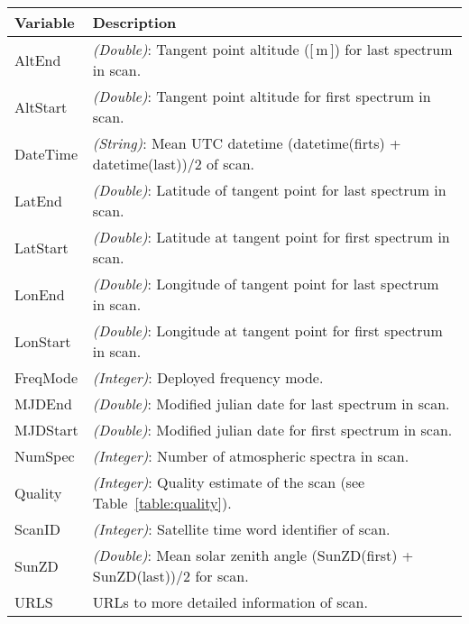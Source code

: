 \begin{table}
\caption{Content description of Level1 log data of a scan as returned from GET calls to
\url{/rest_api/<version>/level1/<freqmode>/<scanno>/Log/}.
Latitudes and longitudes are given as geodetic
coordinates using WGS84 reference ellipsoid.
}
\label{table:logdataformat}
\begin{longtable}{| p{} | p{} |}
\hline
  \textbf{Variable} & \textbf{Description} \\
  \hline
    AltEnd                & \emph{(Double)}: Tangent point altitude ([\,m\,]) for last spectrum in scan. \\ \hline
    AltStart              & \emph{(Double)}: Tangent point altitude for first spectrum in scan. \\ \hline
    DateTime              & \emph{(String)}: Mean UTC datetime (datetime(firts) + datetime(last))/2 of scan. \\ \hline
    LatEnd                & \emph{(Double)}: Latitude of tangent point for last spectrum in scan. \\ \hline
    LatStart              & \emph{(Double)}: Latitude at tangent point for first spectrum in scan. \\ \hline
    LonEnd                & \emph{(Double)}: Longitude of tangent point for last spectrum in scan. \\ \hline
    LonStart              & \emph{(Double)}: Longitude at tangent point for first spectrum in scan. \\ \hline
    FreqMode              & \emph{(Integer)}: Deployed frequency mode. \\ \hline
    MJDEnd                & \emph{(Double)}: Modified julian date for last spectrum in scan. \\ \hline
    MJDStart              & \emph{(Double)}: Modified julian date for first spectrum in scan. \\ \hline
    NumSpec               & \emph{(Integer)}: Number of atmospheric spectra in scan. \\ \hline
    Quality               & \emph{(Integer)}: Quality estimate of the scan (see Table~\ref{table:quality}). \\ \hline
    ScanID                & \emph{(Integer)}: Satellite time word identifier of scan.\\ \hline
    SunZD                 & \emph{(Double)}: Mean solar zenith angle  (SunZD(first) + SunZD(last))/2 for scan.\\ \hline
    URLS                  & URLs to more detailed information of scan. 

\end{longtable}
\end{table}
